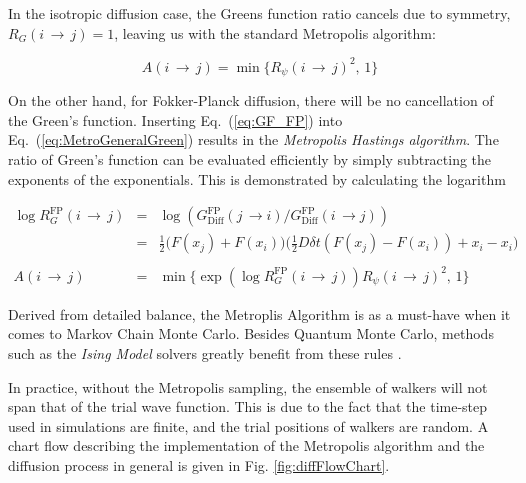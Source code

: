 In the isotropic diffusion case, the Greens function ratio cancels due to symmetry, $R_G(i\,\rightarrow\,j) = 1$, leaving us with the standard Metropolis algorithm:

\begin{equation}
\label{eq:Metropolis_standard}
 A(i\,\rightarrow\,j) = \min\{R_\psi(i\,\rightarrow\,j)^2, \,1\}
\end{equation}

On the other hand, for Fokker-Planck diffusion, there will be no cancellation of the Green's function. Inserting Eq.~(\ref{eq:GF_FP}) into Eq.~(\ref{eq:MetroGeneralGreen}) results in the \textit{Metropolis Hastings algorithm}. The ratio of Green's function can be evaluated efficiently by simply subtracting the exponents of the exponentials. This is demonstrated by calculating the logarithm

\begin{eqnarray}
 \log{R_G^\mathrm{FP}(i\,\rightarrow\,j)} &=& \log \left(G_\mathrm{Diff}^\mathrm{FP}(j\,\rightarrow i)/G_\mathrm{Diff}^\mathrm{FP}(i\,\rightarrow j)\right) \nonumber \\
                                    &=& \frac{1}{2}\big(F(x_j) + F(x_i)\big)\big(\frac{1}{2}D\delta t(F(x_j) - F(x_i)) + x_i - x_i\big) \\
                                    \nonumber\\
 A(i\,\rightarrow\,j) &=& \min\{\exp \left(\log R_G^\mathrm{FP}(i\,\rightarrow\,j)\right)R_\psi(i\,\rightarrow\,j)^2, \,1\} \label{eq:MetropolisHastings}
\end{eqnarray}

Derived from detailed balance, the Metroplis Algorithm is as a must-have when it comes to Markov Chain Monte Carlo. Besides Quantum Monte Carlo, methods such as the \textit{Ising Model} solvers greatly benefit from these rules \cite{morten}.

In practice, without the Metropolis sampling, the ensemble of walkers will not span that of the trial wave function. This is due to the fact that the time-step used in simulations are finite, and the trial positions of walkers are random. A chart flow describing the implementation of the Metropolis algorithm and the diffusion process in general is given in Fig. \ref{fig:diffFlowChart}.

